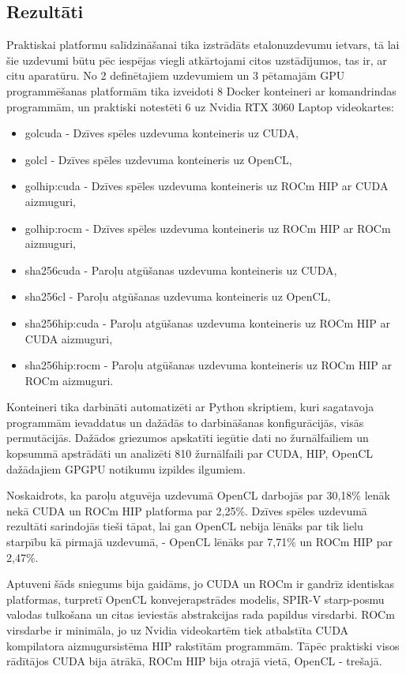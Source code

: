 \begin{center}
    \chapter{Rezultāti}
\end{center}

Praktiskai platformu salīdzināšanai tika izstrādāts etalonuzdevumu ietvars, tā
lai šie uzdevumi būtu pēc iespējas viegli atkārtojami citos uzstādījumos, tas
ir, ar citu aparatūru. No 2 definētajiem uzdevumiem un 3 pētamajām GPU
programmēšanas platformām tika izveidoti 8 Docker konteineri ar komandrindas
programmām, un praktiski notestēti 6 uz Nvidia RTX 3060 Laptop videokartes:
\begin{itemize}
    \setlength\itemsep{0pt}
    \item golcuda - Dzīves spēles uzdevuma konteineris uz CUDA,
    \item golcl - Dzīves spēles uzdevuma konteineris uz OpenCL,
    \item golhip:cuda - Dzīves spēles uzdevuma konteineris uz ROCm HIP ar CUDA aizmuguri,
    \item golhip:rocm - Dzīves spēles uzdevuma konteineris uz ROCm HIP ar ROCm aizmuguri,
    \item sha256cuda - Paroļu atgūšanas uzdevuma konteineris uz CUDA,
    \item sha256cl - Paroļu atgūšanas uzdevuma konteineris uz OpenCL,
    \item sha256hip:cuda - Paroļu atgūšanas uzdevuma konteineris uz ROCm HIP ar CUDA aizmuguri,
    \item sha256hip:rocm - Paroļu atgūšanas uzdevuma konteineris uz ROCm HIP ar ROCm aizmuguri.
\end{itemize}

Konteineri tika darbināti automatizēti ar Python skriptiem, kuri sagatavoja
programmām ievaddatus un dažādās to darbināšanas konfigurācijās, visās
permutācijās. Dažādos griezumos apskatīti iegūtie dati no žurnālfailiem un
kopsummā apstrādāti un analizēti 810 žurnālfaili par CUDA, HIP, OpenCL
dažādajiem GPGPU notikumu izpildes ilgumiem.

Noskaidrots, ka paroļu atguvēja uzdevumā OpenCL darbojās par 30,18\% lenāk nekā
CUDA un ROCm HIP platforma par 2,25\%.
Dzīves spēles uzdevumā rezultāti sarindojās tieši tāpat, lai gan OpenCL nebija
lēnāks par tik lielu starpību kā pirmajā uzdevumā, - OpenCL lēnāks par 7,71\% un
ROCm HIP par 2,47\%.

Aptuveni šāds sniegums bija gaidāms, jo CUDA un ROCm ir gandrīz identiskas
platformas, turpretī OpenCL konvejerapstrādes modelis, SPIR-V starp-posmu
valodas tulkošana un citas ieviestās abstrakcijas rada papildus virsdarbi. ROCm
virsdarbe ir minimāla, jo uz Nvidia videokartēm tiek atbalstīta CUDA
kompilatora aizmugursistēma HIP rakstītām programmām. Tāpēc praktiski
visos rādītājos CUDA bija ātrākā, ROCm HIP bija otrajā vietā, OpenCL - trešajā.

